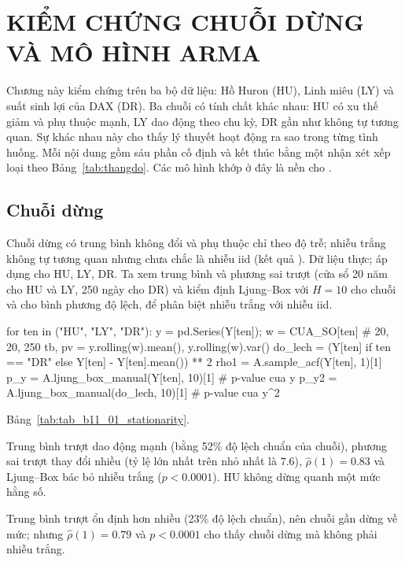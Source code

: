 \clearpage
\section[Kiểm chứng chuỗi dừng và mô hình ARMA]{KIỂM CHỨNG CHUỖI DỪNG VÀ MÔ HÌNH ARMA}

Chương này kiểm chứng  trên ba bộ dữ liệu: Hồ Huron (HU), Linh miêu (LY) và suất sinh lợi của DAX (DR). Ba chuỗi có tính chất khác nhau: HU có xu thế giảm và phụ thuộc mạnh, LY dao động theo chu kỳ, DR gần như không tự tương quan. Sự khác nhau này cho thấy lý thuyết hoạt động ra sao trong từng tình huống. Mỗi nội dung gồm sáu phần cố định và kết thúc bằng một nhận xét xếp loại theo Bảng~\ref{tab:thangdo}. Các mô hình khớp ở đây là nền cho .

\subsection{Chuỗi dừng}

 Chuỗi dừng có trung bình không đổi và phụ thuộc chỉ theo độ trễ; nhiễu trắng không tự tương quan nhưng chưa chắc là nhiễu iid (kết quả ).
 Dữ liệu thực; áp dụng cho HU, LY, DR. Ta xem trung bình và phương sai trượt (cửa sổ 20 năm cho HU và LY, 250 ngày cho DR) và kiểm định Ljung--Box với $H=10$ cho chuỗi và cho bình phương độ lệch, để phân biệt nhiễu trắng với nhiễu iid.
\begin{codeblock}
for ten in ("HU", "LY", "DR"):
    y = pd.Series(Y[ten]); w = CUA_SO[ten]                 # 20, 20, 250
    tb, pv = y.rolling(w).mean(), y.rolling(w).var()
    do_lech = (Y[ten] if ten == "DR" else Y[ten] - Y[ten].mean()) ** 2
    rho1 = A.sample_acf(Y[ten], 1)[1]
    p_y = A.ljung_box_manual(Y[ten], 10)[1]                # p-value cua y
    p_y2 = A.ljung_box_manual(do_lech, 10)[1]              # p-value cua y^2
\end{codeblock}
 Bảng~\ref{tab:tab_b11_01_stationarity}.

 Trung bình trượt dao động mạnh (bằng 52\% độ lệch chuẩn của chuỗi), phương sai trượt thay đổi nhiều (tỷ lệ lớn nhất trên nhỏ nhất là $7.6$), $\hat\rho(1)=0.83$ và Ljung--Box bác bỏ nhiễu trắng ($p<0.0001$). HU không dừng quanh một mức hằng số.

 Trung bình trượt ổn định hơn nhiều (23\% độ lệch chuẩn), nên chuỗi gần dừng về mức; nhưng $\hat\rho(1)=0.79$ và $p<0.0001$ cho thấy chuỗi dừng mà không phải nhiễu trắng.

